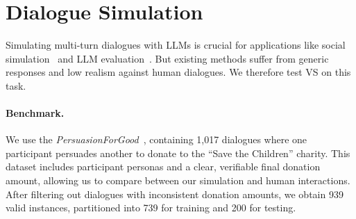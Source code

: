 \section{Dialogue Simulation} \label{sec:dialogue_simulation_task}
\vspace{-0.5em}


Simulating multi-turn dialogues with LLMs is crucial for applications like social simulation~\citep{lin2025usersimulators, anthisposition} and LLM evaluation~\citep{zhou2024sotopiainteractiveevaluationsocial}. But existing methods suffer from generic responses and low realism against human dialogues. We therefore test VS on this task.

\paragraph{Benchmark.}
We use the \textit{PersuasionForGood}~\citep{wang-etal-2019-persuasion}, containing 1,017 dialogues where one participant persuades another to donate to the ``Save the Children'' charity. 
This dataset includes participant personas and a clear, verifiable final donation amount, allowing us to compare between our simulation and human interactions. After filtering out dialogues with inconsistent donation amounts, we obtain 939 valid instances, partitioned into 739 for training and 200 for testing.




